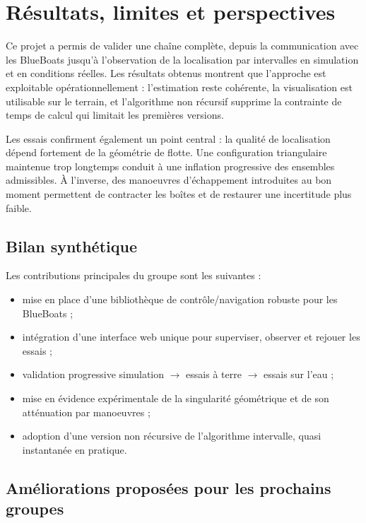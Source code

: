 \section{Résultats, limites et perspectives}

Ce projet a permis de valider une chaîne complète, depuis la communication avec les BlueBoats jusqu'à l'observation de la localisation par intervalles en simulation et en conditions réelles. Les résultats obtenus montrent que l'approche est exploitable opérationnellement : l'estimation reste cohérente, la visualisation est utilisable sur le terrain, et l'algorithme non récursif supprime la contrainte de temps de calcul qui limitait les premières versions.

Les essais confirment également un point central : la qualité de localisation dépend fortement de la géométrie de flotte. Une configuration triangulaire maintenue trop longtemps conduit à une inflation progressive des ensembles admissibles. À l'inverse, des manoeuvres d'échappement introduites au bon moment permettent de contracter les boîtes et de restaurer une incertitude plus faible.

\subsection{Bilan synthétique}

Les contributions principales du groupe sont les suivantes :
\begin{itemize}
	\item mise en place d'une bibliothèque de contrôle/navigation robuste pour les BlueBoats ;
	\item intégration d'une interface web unique pour superviser, observer et rejouer les essais ;
	\item validation progressive simulation $\rightarrow$ essais à terre $\rightarrow$ essais sur l'eau ;
	\item mise en évidence expérimentale de la singularité géométrique et de son atténuation par manoeuvres ;
	\item adoption d'une version non récursive de l'algorithme intervalle, quasi instantanée en pratique.
\end{itemize}

\subsection{Améliorations proposées pour les prochains groupes}

